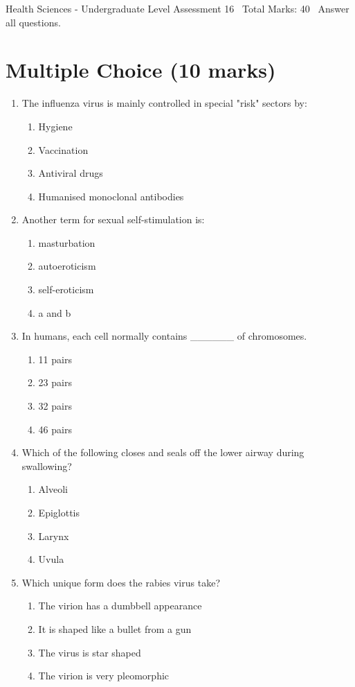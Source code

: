 \documentclass[12pt]{article}
\begin{document}
\begin{center}
Health Sciences - Undergraduate Level Assessment 16 \
Total Marks: 40 \
Answer all questions.
\end{center}

\section*{Multiple Choice (10 marks)}
\begin{enumerate}[label=\arabic*.]
\item The influenza virus is mainly controlled in special "risk" sectors by:
\begin{enumerate}[label=(\alph*)]
    \item Hygiene
    \item Vaccination
    \item Antiviral drugs
    \item Humanised monoclonal antibodies
\end{enumerate}
\item Another term for sexual self-stimulation is:
\begin{enumerate}[label=(\alph*)]
    \item masturbation
    \item autoeroticism
    \item self-eroticism
    \item a and b
\end{enumerate}
\item In humans, each cell normally contains \_\_\_\_\_\_ of chromosomes.
\begin{enumerate}[label=(\alph*)]
    \item 11 pairs
    \item 23 pairs
    \item 32 pairs
    \item 46 pairs
\end{enumerate}
\item Which of the following closes and seals off the lower airway during swallowing?
\begin{enumerate}[label=(\alph*)]
    \item Alveoli
    \item Epiglottis
    \item Larynx
    \item Uvula
\end{enumerate}
\item Which unique form does the rabies virus take?
\begin{enumerate}[label=(\alph*)]
    \item The virion has a dumbbell appearance
    \item It is shaped like a bullet from a gun
    \item The virus is star shaped
    \item The virion is very pleomorphic
\end{enumerate}
\end{enumerate}
\end{document}
